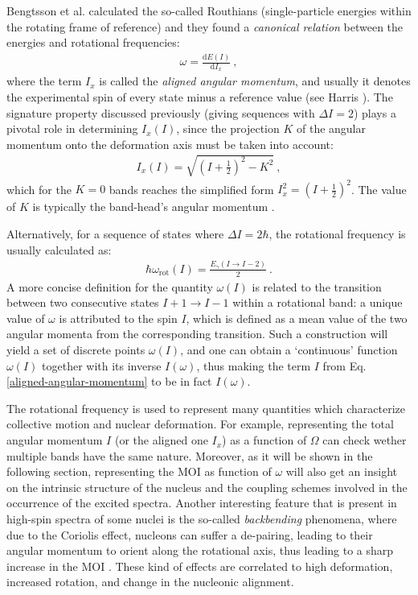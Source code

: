 Bengtsson et al. \cite{bengtsson1979quasiparticle} calculated the so-called Routhians (single-particle energies within the rotating frame of reference) and they found a \emph {canonical relation} between the energies and rotational frequencies:
\begin{align}
    \omega=\frac{\text{d}E(I)}{\text{d}I_x}\ ,
    \label{rotational-frequency-canonical-definition}
\end{align}
where the term $I_x$ is called the \emph{aligned angular momentum}, and usually it denotes the experimental spin of every state minus a reference value (see Harris \cite{harris1965higher}). The signature property discussed previously (giving sequences with $\Delta I=2$) plays a pivotal role in determining $I_x(I)$, since the projection $K$ of the angular momentum onto the deformation axis must be taken into account:
\begin{align}
    I_x(I)=\sqrt{\left(I+\frac{1}{2}\right)^2-K^2}\ ,
    \label{aligned-angular-momentum}
\end{align}
which for the $K=0$ bands reaches the simplified form $I_x^2=(I+\frac{1}{2})^2$. The value of $K$ is typically the band-head's angular momentum \cite{bengtsson1979quasiparticle,bengtsson1984signature}. 

Alternatively, for a sequence of states where $\Delta I=2\hbar$, the rotational frequency is usually calculated as:
\begin{align}
    \hbar\omega_\text{rot}(I)=\frac{E_\gamma(I\to I-2)}{2}\ .
    \label{rotational-frequency-canonical}
\end{align}
A more concise definition for the quantity $\omega(I)$ is related to the transition between two consecutive states $I+1\to I-1$ within a rotational band: a unique value of $\omega$ is attributed to the spin $I$, which is defined as a mean value of the two angular momenta from the corresponding transition. Such a construction will yield a set of discrete points $\omega(I)$, and one can obtain a `continuous' function $\omega(I)$ together with its inverse $I(\omega)$, thus making the term $I$ from Eq. \ref{aligned-angular-momentum} to be in fact $I(\omega)$.

The rotational frequency is used to represent many quantities which characterize collective motion and nuclear deformation. For example, representing the total angular momentum $I$ (or the aligned one $I_x$) as a function of $\Omega$ can check wether multiple bands have the same nature. Moreover, as it will be shown in the following section, representing the MOI as function of $\omega$ will also get an insight on the intrinsic structure of the nucleus and the coupling schemes involved in the occurrence of the excited spectra. Another interesting feature that is present in high-spin spectra of some nuclei is the so-called \emph{backbending} phenomena, where due to the Coriolis effect, nucleons can suffer a de-pairing, leading to their angular momentum to orient along the rotational axis, thus leading to a sharp increase in the MOI \cite{ring2004nuclear,kvasil2004backbending}. These kind of effects are correlated to high deformation, increased rotation, and change in the nucleonic alignment.

